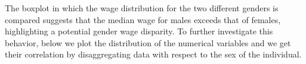 \documentclass[
  letterpaper,
  DIV=11,
  numbers=noendperiod]{scrartcl}
\newenvironment{Shaded}{\begin{snugshade}}{\end{snugshade}}
\newcommand{\AttributeTok}[1]{\textcolor[rgb]{0.40,0.45,0.13}{#1}}
\newcommand{\CommentTok}[1]{\textcolor[rgb]{0.37,0.37,0.37}{#1}}
\newcommand{\ConstantTok}[1]{\textcolor[rgb]{0.56,0.35,0.01}{#1}}
\newcommand{\FunctionTok}[1]{\textcolor[rgb]{0.28,0.35,0.67}{#1}}
\newcommand{\NormalTok}[1]{\textcolor[rgb]{0.00,0.23,0.31}{#1}}
\newcommand{\OtherTok}[1]{\textcolor[rgb]{0.00,0.23,0.31}{#1}}
\newcommand{\SpecialCharTok}[1]{\textcolor[rgb]{0.37,0.37,0.37}{#1}}
\newcommand{\StringTok}[1]{\textcolor[rgb]{0.13,0.47,0.30}{#1}}
\begin{document}
The boxplot in which the wage distribution for the two different genders
is compared suggests that the median wage for males exceeds that of
females, highlighting a potential gender wage disparity. To further
investigate this behavior, below we plot the distribution of the
numerical variables and we get their correlation by disaggregating data
with respect to the sex of the individual.

\begin{Shaded}
\end{Shaded}
\end{document}
